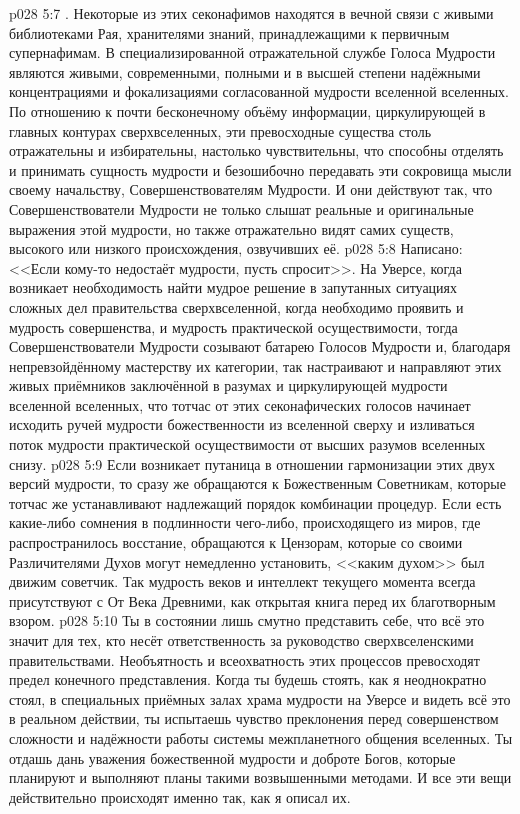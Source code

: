 \vs p028 5:7 . Некоторые из этих секонафимов находятся в вечной связи с живыми библиотеками Рая, хранителями знаний, принадлежащими к первичным супернафимам. В специализированной отражательной службе Голоса Мудрости являются живыми, современными, полными и в высшей степени надёжными концентрациями и фокализациями согласованной мудрости вселенной вселенных. По отношению к почти бесконечному объёму информации, циркулирующей в главных контурах сверхвселенных, эти превосходные существа столь отражательны и избирательны, настолько чувствительны, что способны отделять и принимать сущность мудрости и безошибочно передавать эти сокровища мысли своему начальству, Совершенствователям Мудрости. И они действуют так, что Совершенствователи Мудрости не только слышат реальные и оригинальные выражения этой мудрости, но также отражательно видят самих существ, высокого или низкого происхождения, озвучивших её.
\vs p028 5:8 Написано: <<Если кому\hyp{}то недостаёт мудрости, пусть спросит>>. На Уверсе, когда возникает необходимость найти мудрое решение в запутанных ситуациях сложных дел правительства сверхвселенной, когда необходимо проявить и мудрость совершенства, и мудрость практической осуществимости, тогда Совершенствователи Мудрости созывают батарею Голосов Мудрости и, благодаря непревзойдённому мастерству их категории, так настраивают и направляют этих живых приёмников заключённой в разумах и циркулирующей мудрости вселенной вселенных, что тотчас от этих секонафических голосов начинает исходить ручей мудрости божественности из вселенной сверху и изливаться поток мудрости практической осуществимости от высших разумов вселенных снизу.
\vs p028 5:9 Если возникает путаница в отношении гармонизации этих двух версий мудрости, то сразу же обращаются к Божественным Советникам, которые тотчас же устанавливают надлежащий порядок комбинации процедур. Если есть какие\hyp{}либо сомнения в подлинности чего\hyp{}либо, происходящего из миров, где распространилось восстание, обращаются к Цензорам, которые со своими Различителями Духов могут немедленно установить, <<каким духом>> был движим советчик. Так мудрость веков и интеллект текущего момента всегда присутствуют с От Века Древними, как открытая книга перед их благотворным взором.
\vs p028 5:10 Ты в состоянии лишь смутно представить себе, что всё это значит для тех, кто несёт ответственность за руководство сверхвселенскими правительствами. Необъятность и всеохватность этих процессов превосходят предел конечного представления. Когда ты будешь стоять, как я неоднократно стоял, в специальных приёмных залах храма мудрости на Уверсе и видеть всё это в реальном действии, ты испытаешь чувство преклонения перед совершенством сложности и надёжности работы системы межпланетного общения вселенных. Ты отдашь дань уважения божественной мудрости и доброте Богов, которые планируют и выполняют планы такими возвышенными методами. И все эти вещи действительно происходят именно так, как я описал их.
